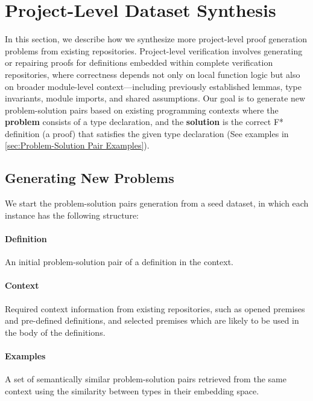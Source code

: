 \section{Project-Level Dataset Synthesis}





In this section, we describe how we synthesize more project-level proof generation problems from existing repositories. Project-level verification involves generating or repairing proofs for definitions embedded within complete verification repositories, where correctness depends not only on local function logic but also on broader module-level context—including previously established lemmas, type invariants, module imports, and shared assumptions. Our goal is to generate new problem-solution pairs based on existing programming contexts where the \textbf{problem} consists of a type declaration, and the \textbf{solution} is the correct F* definition (a proof) that satisfies the given type declaration (See examples in \ref{sec:Problem-Solution Pair Examples}).

\subsection{Generating New Problems} \label{Generating New Problems}

We start the problem-solution pairs generation from a seed dataset, in which each instance has the following structure:


    \paragraph{Definition}An initial problem-solution pair of a definition in the context. 
    \paragraph{Context} Required context information from existing repositories, such as opened premises and pre-defined definitions, and selected premises which are likely to be used in the body of the definitions\cite{yang2023leandojo}.
    \paragraph{Examples} A set of semantically similar problem-solution pairs retrieved from the same context using the similarity between types in their embedding space\cite{chakraborty2024towards}.


